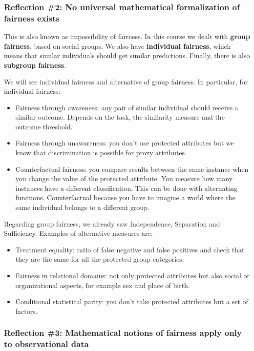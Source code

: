 \subsubsection{Reflection \#2: No universal mathematical formalization of fairness exists}
This is also known as impossibility of fairness. In this course we dealt with \textbf{group fairness}, based on social groups. We also have \textbf{individual fairness}, which means that similar individuals should get similar predictions. Finally, there is also \textbf{subgroup fairness}. 

We will see individual fairness and alternative of group fairness.
In particular, for individual fairness:
\begin{itemize}
    \item Fairness through awareness: any pair of similar individual should receive a similar outcome. Depends on the task, the similarity measure and the outcome threshold.
    \item Fairness through unawareness: you don't use protected attributes but we know that discrimination is possible for proxy attributes.
    \item Counterfactual fairness: you compare results between the same instance when you change the value of the protected attribute. You measure how many instances have a different classification. This can be done with alternating functions. Counterfactual because you have to imagine a world where the same individual belongs to a different group.
\end{itemize}
Regarding group fairness, we already saw Independence, Separation and Sufficiency. Examples of alternative measures are:
\begin{itemize}
    \item Treatment equality: ratio of false negative and false positives and check that they are the same for all the protected group categories.
    \item Fairness in relational domains: not only protected attributes but also social or organizational aspects, for example sex and place of birth. 
    \item Conditional statistical parity: you don't take protected attributes but a set of factors.
\end{itemize}
\subsubsection{Reflection \#3: Mathematical notions of fairness apply only to observational data}
